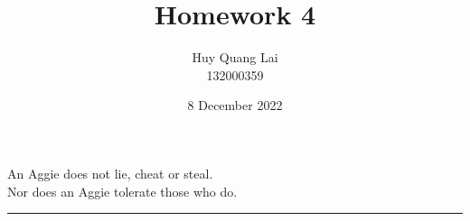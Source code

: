 \documentclass[fleqn,12pt]{article}
\title{\vspace{-2.5cm}Homework 4}
\author{\vspace{-0.2cm} Huy Quang Lai\\132000359}
\affil{Texas A\&M University}
\date{\vspace{-0.5cm}8 December 2022}
\begin{document}
\maketitle
\begin{center}
{\large
An Aggie does not lie, cheat or steal.\\
Nor does an Aggie tolerate those who do.
}
\rule{\textwidth}{.1pt}
\end{center}


\end{document}
